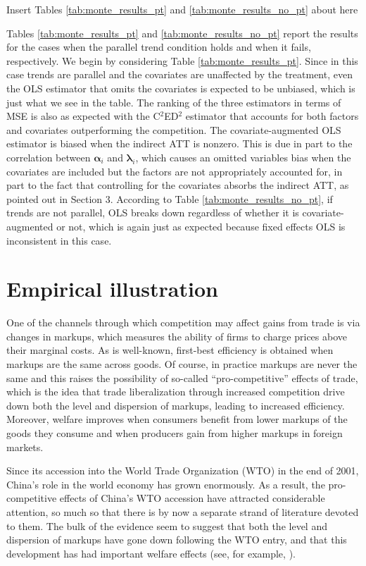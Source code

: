 \documentclass[12pt,fleqn]{article}
\def\+#1{\boldsymbol{#1}}
\begin{document}
\begin{center}
{\sc Insert Tables \ref{tab:monte_results_pt} and \ref{tab:monte_results_no_pt} about here}
\end{center}

Tables \ref{tab:monte_results_pt} and \ref{tab:monte_results_no_pt} report the results for the cases when the parallel trend condition holds and when it fails, respectively. We begin by considering Table \ref{tab:monte_results_pt}. Since in this case trends are parallel and the covariates are unaffected by the treatment, even the OLS estimator that omits the covariates is expected to be unbiased, which is just what we see in the table. The ranking of the three estimators in terms of MSE is also as expected with the C$^2$ED$^2$ estimator that accounts for both factors and covariates outperforming the competition. The covariate-augmented OLS estimator is biased when the indirect ATT is nonzero. This is due in part to the correlation between $\+\alpha_i$ and $\+\lambda_i$, which causes an omitted variables bias when the covariates are included but the factors are not appropriately accounted for, in part to the fact that controlling for the covariates absorbs the indirect ATT, as pointed out in Section 3. According to Table \ref{tab:monte_results_no_pt}, if trends are not parallel, OLS breaks down regardless of whether it is covariate-augmented or not, which is again just as expected because fixed effects OLS is inconsistent in this case.

\section{Empirical illustration}

One of the channels through which competition may affect gains from trade is via changes in markups, which measures the ability of firms to charge prices above their marginal costs. As is well-known, first-best efficiency is obtained when markups are the same across goods. Of course, in practice markups are never the same and this raises the possibility of so-called ``pro-competitive'' effects of trade, which is the idea that trade liberalization through increased competition drive down both the level and dispersion of markups, leading to increased efficiency. Moreover, welfare improves when consumers benefit from lower markups of the goods they consume and when producers gain from higher markups in foreign markets.

Since its accession into the World Trade Organization (WTO) in the end of 2001, China's role in the world economy has grown enormously. As a result, the pro-competitive effects of China's WTO accession have attracted considerable attention, so much so that there is by now a separate strand of literature devoted to them. The bulk of the evidence seem to suggest that both the level and dispersion of markups have gone down following the WTO entry, and that this development has had important welfare effects (see, for example, \citealp{Hsu_etal_2020}).
\end{document}

